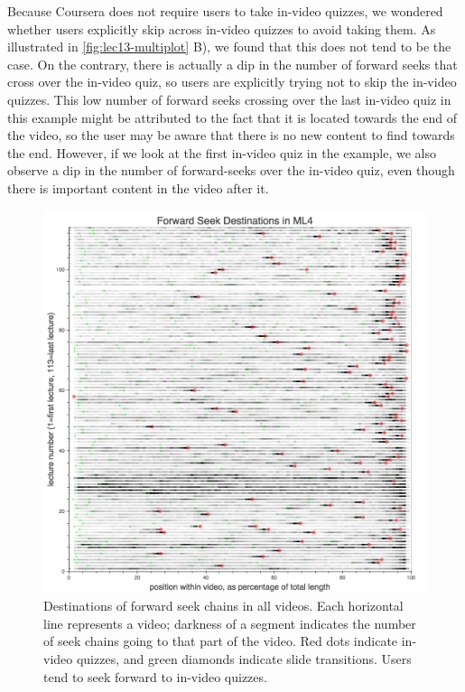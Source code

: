 \documentclass{sigchi}
\begin{document}
Because Coursera does not require users to take in-video quizzes, we wondered whether users explicitly skip across in-video quizzes to avoid taking them. As illustrated in \autoref{fig:lec13-multiplot} B), we found that this does not tend to be the case. On the contrary, there is actually a dip in the number of forward seeks that cross over the in-video quiz, so users are explicitly trying not to skip the in-video quizzes. This low number of forward seeks crossing over the last in-video quiz in this example might be attributed to the fact that it is located towards the end of the video, so the user may be aware that there is no new content to find towards the end. However, if we look at the first in-video quiz in the example, we also observe a dip in the number of forward-seeks over the in-video quiz, even though there is important content in the video after it.


\begin{figure}
\includegraphics[width=1.0\columnwidth]{forward-seek-destinations-allvideos}
\caption{Destinations of forward seek chains in all videos. Each horizontal line represents a video; darkness of a segment indicates the number of seek chains going to that part of the video. Red dots indicate in-video quizzes, and green diamonds indicate slide transitions. Users tend to seek forward to in-video quizzes.}
\label{fig:forward-seek-destinations-allvideos}
\end{figure}
\end{document}
